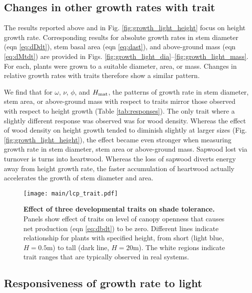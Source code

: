 \documentclass[9pt,twocolumn,twoside,lineno]{pnas-new}
\begin{document}
\subsection{Changes in other growth rates with trait}

The results reported above and in Fig. \ref{fig:growth_light_height} focus on height growth rate. Corresponding results for absolute growth rates in stem diameter (eqn \ref{eq:dDdt}), stem basal area (eqn \ref{eq:dast}), and above-ground mass (eqn \ref{eq:dMtdt}) are provided in Figs. \ref{fig:growth_light_dia}--\ref{fig:growth_light_mass}. For each, plants were grown to a suitable diameter, area, or mass. Changes in relative growth rates with traits therefore show a similar pattern.

We find that for $\omega$, $\nu$, $\phi$, and $H_{\rm mat}$, the patterns of growth rate in stem diameter, stem area, or above-ground mass with respect to traits mirror those observed with respect to height growth (Table \ref{tab:responses}). The only trait where a slightly different response was observed was for wood density. Whereas the effect of wood density on height growth tended to diminish slightly at larger sizes (Fig. \ref{fig:growth_light_height}), the effect became even stronger when measuring growth rate in stem diameter, stem area or above-ground mass. Sapwood lost via turnover is turns into heartwood. Whereas the loss of sapwood diverts energy away from height growth rate, the faster accumulation of heartwood actually accelerates the growth of stem diameter and area.

\begin{SCfigure*}[\sidecaptionrelwidth][b]
\centering
\texttt{[image: main/lcp\_trait.pdf]}
\caption{\textbf{Effect of three developmental traits on shade tolerance.}
Panels show effect of traits on level of canopy openness that causes net production (eqn \ref{eq:dbdt}) to be zero. Different lines indicate relationship for plants with specified height, from short (light blue,  $H=0.5$m) to tall (dark line, $H=20$m). The white regions indicate trait ranges that are typically observed in real systems.
\label{fig:wplcp}}
\end{SCfigure*}

\subsection{Responsiveness of growth rate to light}
\end{document}
